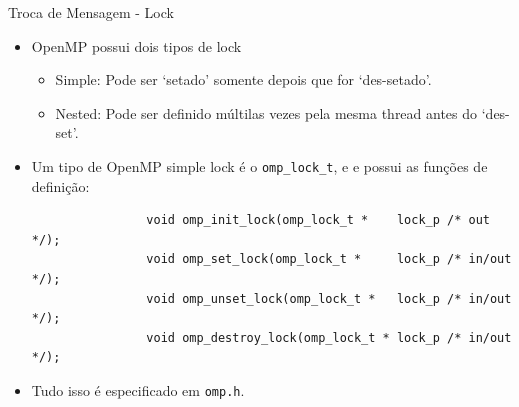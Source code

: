 	\begin{frame}[fragile]{Troca de Mensagem -  Lock}
		\begin{itemize}
			\item OpenMP possui dois tipos de lock
			\begin{itemize}
				\item Simple: Pode ser `setado' somente depois que for `des-setado'.
				\item Nested: Pode ser definido múltilas vezes pela mesma thread antes do `des-set'.
			\end{itemize}
			\item Um tipo de OpenMP simple lock é o {\tt omp\_lock\_t}, e e possui as funções de definição:
			\begin{verbatim}
				void omp_init_lock(omp_lock_t *    lock_p /* out */);
				void omp_set_lock(omp_lock_t *     lock_p /* in/out */); 
				void omp_unset_lock(omp_lock_t *   lock_p /* in/out */);  
				void omp_destroy_lock(omp_lock_t * lock_p /* in/out */);    
			\end{verbatim}
			\item Tudo isso é especificado em {\tt omp.h}.
		\end{itemize}
\end{frame}



